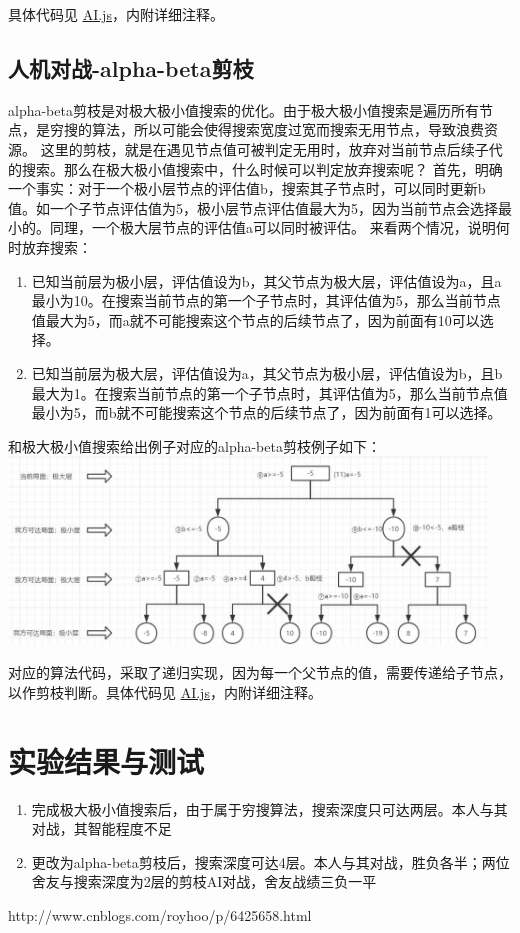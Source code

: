 具体代码见 \underline{\href{https://github.com/xwy27/ArtificialIntelligenceProjects/blob/master/AI_Web/static/js/ChineseChess/AI.js}{AI.js}}，内附详细注释。

\subsection{人机对战-alpha-beta剪枝}

alpha-beta剪枝是对极大极小值搜索的优化。由于极大极小值搜索是遍历所有节点，是穷搜的算法，所以可能会使得搜索宽度过宽而搜索无用节点，导致浪费资源。
这里的剪枝，就是在遇见节点值可被判定无用时，放弃对当前节点后续子代的搜索。那么在极大极小值搜索中，什么时候可以判定放弃搜索呢？
首先，明确一个事实：对于一个极小层节点的评估值b，搜索其子节点时，可以同时更新b值。如一个子节点评估值为5，极小层节点评估值最大为5，因为当前节点会选择最小的。同理，一个极大层节点的评估值a可以同时被评估。
来看两个情况，说明何时放弃搜索：
\begin{enumerate}
    \item 已知当前层为极小层，评估值设为b，其父节点为极大层，评估值设为a，且a最小为10。在搜索当前节点的第一个子节点时，其评估值为5，那么当前节点值最大为5，而a就不可能搜索这个节点的后续节点了，因为前面有10可以选择。
    \item 已知当前层为极大层，评估值设为a，其父节点为极小层，评估值设为b，且b最大为1。在搜索当前节点的第一个子节点时，其评估值为5，那么当前节点值最小为5，而b就不可能搜索这个节点的后续节点了，因为前面有1可以选择。
\end{enumerate}

和极大极小值搜索给出例子对应的alpha-beta剪枝例子如下：\\
\includegraphics[width=5in]{alphaBeta.jpg}

对应的算法代码，采取了递归实现，因为每一个父节点的值，需要传递给子节点，以作剪枝判断。具体代码见 \underline{\href{https://github.com/xwy27/ArtificialIntelligenceProjects/blob/master/AI_Web/static/js/ChineseChess/AI.js}{AI.js}}，内附详细注释。

\section{实验结果与测试}
\begin{enumerate}
    \item 完成极大极小值搜索后，由于属于穷搜算法，搜索深度只可达两层。本人与其对战，其智能程度不足
    \item 更改为alpha-beta剪枝后，搜索深度可达4层。本人与其对战，胜负各半；两位舍友与搜索深度为2层的剪枝AI对战，舍友战绩三负一平
\end{enumerate}

\begin{thebibliography}{}
 http://www.cnblogs.com/royhoo/p/6425658.html
\end{thebibliography}

